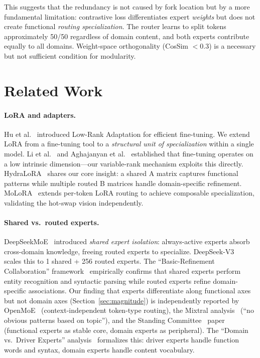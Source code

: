 \documentclass{article}
\begin{document}
This suggests that the redundancy is not caused by fork location but by a more
fundamental limitation: contrastive loss differentiates expert \emph{weights}
but does not create functional \emph{routing specialization}. The router
learns to split tokens approximately 50/50 regardless of domain content,
and both experts contribute equally to all domains. Weight-space orthogonality
(CosSim $<$0.3) is a necessary but not sufficient condition for modularity.

\section{Related Work}
\label{sec:related}

\paragraph{LoRA and adapters.}
Hu et al.~\cite{hu2022lora} introduced Low-Rank Adaptation for efficient
fine-tuning. We extend LoRA from a fine-tuning tool to a \emph{structural unit
of specialization} within a single model. Li et al.~\cite{li2018intrinsic}
and Aghajanyan et al.~\cite{aghajanyan2021intrinsic} established that
fine-tuning operates on a low intrinsic dimension---our variable-rank mechanism
exploits this directly. HydraLoRA~\cite{hydralora2024} shares our core
insight: a shared A matrix captures functional patterns while multiple routed B
matrices handle domain-specific refinement. MoLoRA~\cite{molora2026} extends
per-token LoRA routing to achieve composable specialization, validating the
hot-swap vision independently.

\paragraph{Shared vs.\ routed experts.}
DeepSeekMoE~\cite{deepseek2024moe} introduced \emph{shared expert isolation}:
always-active experts absorb cross-domain knowledge, freeing routed experts to
specialize. DeepSeek-V3~\cite{deepseekv3} scales this to 1 shared + 256
routed experts. The ``Basic-Refinement Collaboration''
framework~\cite{basicrefinement2025} empirically confirms that shared experts
perform entity recognition and syntactic parsing while routed experts refine
domain-specific associations. Our finding that experts differentiate along
functional axes but not domain axes (Section~\ref{sec:magnitude}) is
independently reported by OpenMoE~\cite{openmoe2024} (context-independent
token-type routing), the Mixtral analysis~\cite{mixtral2024} (``no obvious
patterns based on topic''), and the Standing
Committee~\cite{standing2026} paper (functional experts as stable core, domain
experts as peripheral). The ``Domain vs.\ Driver Experts''
analysis~\cite{domaindriver2026} formalizes this: driver experts handle
function words and syntax, domain experts handle content vocabulary.
\end{document}
